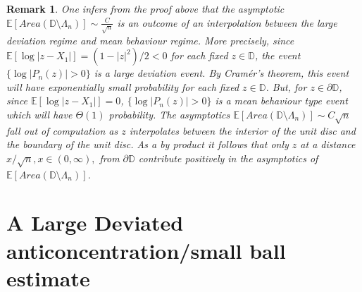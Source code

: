 \documentclass[9pt,a4paper,reqno]{amsart}
\theoremstyle{mine}
\newtheorem{remark}[thm]{Remark}
\theoremstyle{definition}
\theoremstyle{remark}
\newcommand{\mb}{\mathbb}
\begin{document}
\begin{remark} \label{nice-informal-remark}
    One infers from the proof above that the asymptotic $\mb{E}[Area(\mb{D}\setminus \Lambda_n)] \sim \frac{C}{\sqrt{n}}$ is an outcome of an interpolation between the large deviation regime and mean behaviour regime. More precisely, since $\mb{E}[ \log|z-X_1|] = (1-|z|^2)/2 < 0$ for each fixed $z \in \mb{D}$, the event $\{\log |P_n(z)| > 0 \}$ is a large deviation event. By Cram\'er's theorem, this event will have exponentially small probability for each fixed $z \in \mb{D}$. But, for $z\in \partial \mb{D}$, since $\mb{E}[ \log|z-X_1|] = 0$, $\{\log |P_n(z)| > 0 \}$ is a mean behaviour type event which will have $\Theta(1)$ probability. The asymptotics $\mb{E}[Area(\mb{D}\setminus \Lambda_n)] \sim C\sqrt{n}$ fall out of computation as $z$ interpolates between the interior of the unit disc and the boundary of the unit disc. As a by product it follows that only $z$ at a distance $x/\sqrt{n}, x \in (0,\infty),$ from $\partial \mb{D}$ contribute positively in the asymptotics of $\mb{E}[Area(\mb{D}\setminus \Lambda_n)]$.

    
    \end{remark}

\section{A Large Deviated anticoncentration/small ball estimate}\label{section:A Large Deviated anticoncentration/small ball estimate}
\end{document}
